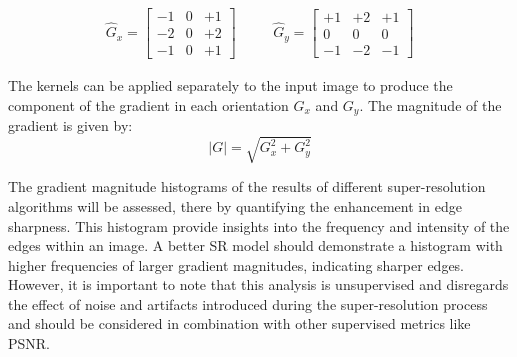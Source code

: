         \begin{equation}
            \begin{array}{ccc}
            \hat{G}_x = \begin{bmatrix}
            -1 & 0 & +1 \\
            -2 & 0 & +2 \\
            -1 & 0 & +1
            \end{bmatrix}
            &
            \quad
            &
            \hat{G}_y = \begin{bmatrix}
            +1 & +2 & +1 \\
             0 &  0 &  0 \\
            -1 & -2 & -1
            \end{bmatrix}
            \end{array}
            \label{eq:4-sobel-operators}
        \end{equation}
    
         The kernels can be applied separately to the input image to produce the component of the gradient in each orientation $G_x$ and $G_y$. The magnitude of the gradient  is given by: 
         \begin{equation}
             |G| = \sqrt{G_x^2 + G_y^2}
             \label{eq:4-gradient_magnitude}
         \end{equation}

         The gradient magnitude histograms of the results of different super-resolution algorithms will be assessed, there by quantifying the enhancement in edge sharpness.
         This histogram provide insights into the frequency and intensity of the edges within an image.
         A better SR model should demonstrate a histogram with higher frequencies of larger gradient magnitudes, indicating sharper edges.
         However, it is important to note that this analysis is unsupervised and disregards the effect of noise and artifacts introduced during the super-resolution process and should be considered in combination with other supervised metrics like PSNR.

